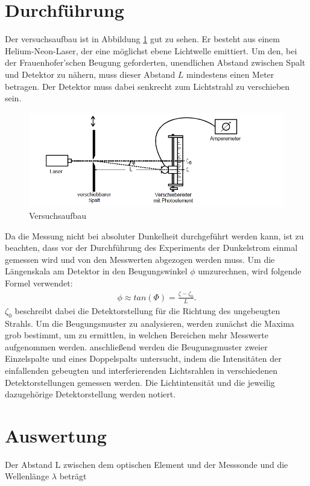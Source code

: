 \section{Durchführung}
Der versuchsaufbau ist in Abbildung \ref{abb5} gut zu sehen. Er besteht aus einem Helium-Neon-Laser,
der eine möglichst ebene Lichtwelle emittiert. Um den, bei der Frauenhofer'schen Beugung geforderten,
unendlichen Abstand zwischen Spalt und Detektor zu nähern, muss dieser Abstand $L$ mindestens einen Meter
betragen. Der Detektor muss dabei senkrecht zum Lichtstrahl zu verschieben sein.
\begin{figure}
  \centering
  \includegraphics[scale=0.7]{aufbau.PNG}
  \caption{Versuchsaufbau \cite{Q1}}
  \label{abb5}
\end{figure}
Da die Messung nicht bei absoluter Dunkelheit durchgeführt werden kann, ist zu beachten,
dass vor der Durchführung des Experiments der Dunkelstrom einmal gemessen wird und von
den Messwerten abgezogen werden muss.
Um die Längenskala am Detektor in den Beugungswinkel $\phi$ umzurechnen, wird folgende
Formel verwendet:
\begin{align*}
  \phi \approx tan(\Phi) = \frac{\zeta - \zeta_0}{L}.
\end{align*}
$\zeta_0$ beschreibt dabei die Detektorstellung für die Richtung des ungebeugten Strahls.
Um die Beugungsmuster zu analysieren, werden zunächst die Maxima grob bestimmt, um zu
ermittlen, in welchen Bereichen mehr Messwerte aufgenommen werden. anschließend werden
die Beugunsgmuster zweier Einzelspalte und eines Doppelspalts untersucht, indem die
Intensitäten der einfallenden gebeugten und interferierenden Lichtsrahlen in verschiedenen
Detektorstellungen gemessen werden. Die Lichtintensität und die jeweilig dazugehörige
Detektorstellung werden notiert.

\section{Auswertung}

Der Abstand L zwischen dem optischen Element und der Messsonde und die Wellenlänge $\lambda$ beträgt

